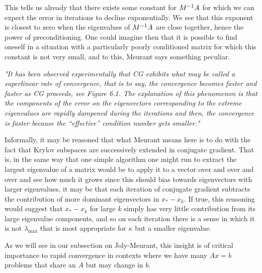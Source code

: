 \documentclass[11pt]{article}
\begin{document}
This tells us already that there exists some constant for $M^{-1} A$ for which we can expect the error in iterations to decline exponentially. We see that this exponent is closest to zero when the eigenvalues of $M^{-1} A$ are close together, hence the power of preconditioning. One could imagine then that it is possible to find oneself in a situation with a particularly poorly conditioned matrix for which this constant is not very small, and to this, Meurant says something peculiar.

\emph{"It has been observed experimentally that CG exhibits what may be called a superlinear rate of convergence, that is to say, the convergence becomes faster and faster as CG proceeds, see Figure 6.1. The explanation of this phenomenon is that the components of the error on the eigenvectors corresponding to the extreme eigenvalues are rapidly dampened during the iterations and then, the convergence is faster because the “effective” condition number gets smaller."}


Informally, it may be reasoned that what Meurant means here is to do with the fact that Krylov subspaces are successively extended in conjugate gradient. That is, in the same way that one simple algorithm one might run to extract the largest eigenvalue of a matrix would be to apply it to a vector over and over and over and see how much it grows since this should bias towards eigenvectors with larger eigenvalues, it may be that each iteration of conjugate gradient subtracts the contribution of more dominant eigenvectors in $x_* - x_k$. If true, this reasoning would suggest that $x_* - x_k$ for large $k$ simply has very little contribution from its large eigenvalue components, and so on each iteration there is a sense in which it is not $\lambda_{\text{max}}$ that is most appropriate for $\kappa$ but a smaller eigenvalue.

As we will see in our subsection on Joly-Meurant, this insight is of critical importance to rapid convergence in contexts where we have many $Ax = b$ problems that share an $A$ but may change in $b$.
\end{document}
